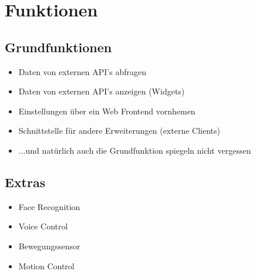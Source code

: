
\section{Funktionen}\label{Funktionen}
\subsection{Grundfunktionen}
\begin{itemize}
\item Daten von externen API's abfragen
\item Daten von externen API's anzeigen (Widgets)
\item Einstellungen über ein Web Frontend vornhemen
\item Schnittstelle für andere Erweiterungen (externe Clients)
\item ...und natürlich auch die Grundfunktion spiegeln nicht vergessen
\end{itemize}

\subsection{Extras}
\begin{itemize}
\item Face Recognition
\item Voice Control
\item Bewegungssensor
\item Motion Control
\end{itemize}

